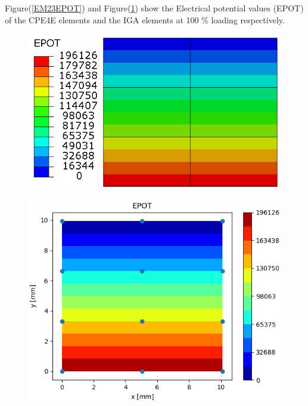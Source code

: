 \documentclass[11pt]{article}
\begin{document}
Figure(\ref{EM23EPOT}) and Figure(\ref{EM23EPOT_IGA}) show the Electrical potential values (EPOT) of the CPE4E elements and the IGA elements at 100 \% loading respectively. \\
\begin{figure}[H]
	\centering
	\begin{minipage}{.5\textwidth}
		\centering
		\includegraphics[width=1\linewidth]{EM23EPOT.png}
		\label{EM23EPOT}
	\end{minipage}%
	\begin{minipage}{.5\textwidth}
		\centering
		\includegraphics[width=1\linewidth]{EM23EPOT_IGA.png}
		\label{EM23EPOT_IGA}
	\end{minipage}
\end{figure}
\end{document}
